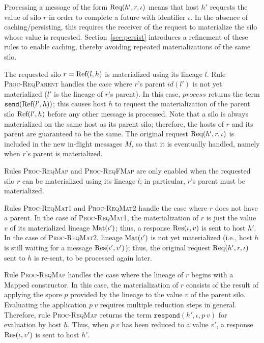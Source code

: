 Processing a message of the form ${\textrm{Req}(h', r, \iota)}$ means that host
$h'$ requests the value of silo $r$ in order to complete a future with
identifier $\iota$. In the absence of caching/persisting, this
requires the receiver of the request to materialize the silo whose
value is requested. Section~\ref{sec:persist} introduces a refinement
of these rules to enable caching, thereby avoiding repeated
materializations of the same silo.



The requested silo $r = {\textrm{Ref}(l, h)}$ is materialized using its lineage
$l$. Rule \\\textsc{Proc-ReqParent} handles the case where $r$'s
parent $id(l')$ is not yet materialized ($l'$ is the lineage of $r$'s
parent). In this case, $\mathit{process}$ returns the term
$\texttt{send}({\textrm{Ref}(l', h)})$; this causes host $h$ to request the
materialization of the parent silo ${\textrm{Ref}(l', h)}$ before any other
message is processed. Note that a silo is always materialized on the
same host as its parent silo; therefore, the hosts of $r$ and its
parent are guaranteed to be the same. The original request ${\textrm{Req}(h', r, \iota)}$ is included in the new in-flight messages $M$, so that it
is eventually handled, namely when $r$'s parent is materialized.

Rules \textsc{Proc-ReqMap} and
\textsc{Proc-ReqFMap} are only enabled when the requested silo $r$ can
be materialized using its lineage $l$; in particular, $r$'s
parent must be materialized.

Rules \textsc{Proc-ReqMat1} and \textsc{Proc-ReqMat2} handle the case where $r$ does not have a
parent. In the case of \textsc{Proc-ReqMat1}, the materialization of $r$ is just the value $v$ of its materialized
lineage ${\textrm{Mat}(\iota')}$; thus, a response ${\textrm{Res}(\iota, v)}$ is
sent to host $h'$.
In the case of \textsc{Proc-ReqMat2}, lineage ${\textrm{Mat}(\iota')}$ is not yet materialized (i.e., host $h$ is still waiting for a message ${\textrm{Res}(\iota', v')}$); thus, the original request ${\textrm{Req}(h', r, \iota)}$ sent to $h$ is re-sent, to be processed again later.

Rule \textsc{Proc-ReqMap} handles the case where the lineage of $r$
begins with a $\text{Mapped}$ constructor. In this case, the
materialization of $r$ consists of the result of applying the spore
$p$ provided by the lineage to the value $v$ of the parent
silo. Evaluating the application $p~v$ requires multiple reduction
steps in general. Therefore, rule \textsc{Proc-ReqMap} returns the
term $\texttt{respond}(h', \iota, p~v)$ for evaluation by host $h$.
Thus, when $p~v$ has been reduced to a value $v'$, a response ${\textrm{Res}(\iota, v')}$ is sent to host $h'$.

